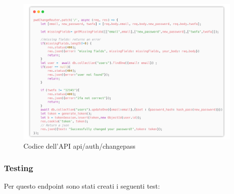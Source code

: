 \documentclass{report}
\begin{document}
\begin{figure}[H]
	\centering\includegraphics[width=1\textwidth]{images/microservizio-autenticazione/changepass-carbon.png}
	Codice dell'API api/auth/changepass
\end{figure}


\subsubsection*{Testing}
Per questo endpoint sono stati creati i seguenti test:
\end{document}
